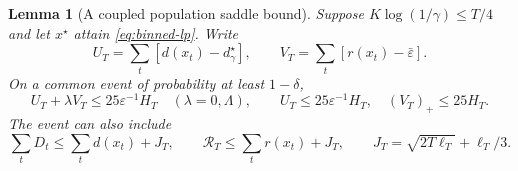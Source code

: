 \documentclass[11pt]{article}
\newtheorem{lemma}[theorem]{Lemma}
\theoremstyle{remark}
\newcommand{\calR}{\mathcal R}
\newcommand{\eps}{\varepsilon}
\begin{document}
\begin{lemma}[A coupled population saddle bound]
\label{lem:saddle}
Suppose $K\log(1/\gamma)\le T/4$ and let $x^\star$ attain
\eqref{eq:binned-lp}. Write
\[
 U_T=\sum_t[d(x_t)-d_\gamma^\star],\qquad
 V_T=\sum_t[r(x_t)-\bar\eps].
\]
On a common event of probability at least $1-\delta$,
\begin{equation}
 U_T+\lambda V_T\le25\eps^{-1}H_T\quad(\lambda=0,\Lambda),
 \qquad U_T\le25\eps^{-1}H_T,\quad (V_T)_+\le25H_T.
 \label{eq:saddle}
\end{equation}
The event can also include
\begin{equation}
 \sum_tD_t\le\sum_td(x_t)+J_T,\qquad
 \calR_T\le\sum_tr(x_t)+J_T,\qquad
 J_T=\sqrt{2T\ell_T}+\ell_T/3.
 \label{eq:realized}
\end{equation}
\end{lemma}
\end{document}
